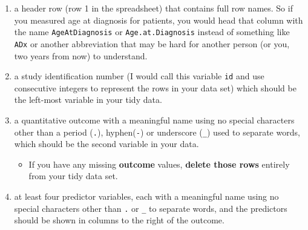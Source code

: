 \documentclass[]{book}
\providecommand{\tightlist}{%
  \setlength{\itemsep}{0pt}\setlength{\parskip}{0pt}}
\theoremstyle{definition}
\theoremstyle{definition}
\theoremstyle{definition}
\theoremstyle{remark}
\begin{document}
\begin{enumerate}
\def\labelenumi{\arabic{enumi}.}
\tightlist
\item
  a header row (row 1 in the spreadsheet) that contains full row names.
  So if you measured age at diagnosis for patients, you would head that
  column with the name \texttt{AgeAtDiagnosis} or
  \texttt{Age.at.Diagnosis} instead of something like \texttt{ADx} or
  another abbreviation that may be hard for another person (or you, two
  years from now) to understand.
\item
  a study identification number (I would call this variable \texttt{id}
  and use consecutive integers to represent the rows in your data set)
  which should be the left-most variable in your tidy data.
\item
  a quantitative outcome with a meaningful name using no special
  characters other than a period (\texttt{.}), hyphen(\texttt{-}) or
  underscore (\texttt{\_}) used to separate words, which should be the
  second variable in your data.

  \begin{itemize}
  \tightlist
  \item
    If you have any missing \textbf{outcome} values, \textbf{delete
    those rows} entirely from your tidy data set.
  \end{itemize}
\item
  at least four predictor variables, each with a meaningful name using
  no special characters other than \texttt{.} or \texttt{\_} to separate
  words, and the predictors should be shown in columns to the right of
  the outcome.


\end{enumerate}
\end{document}
